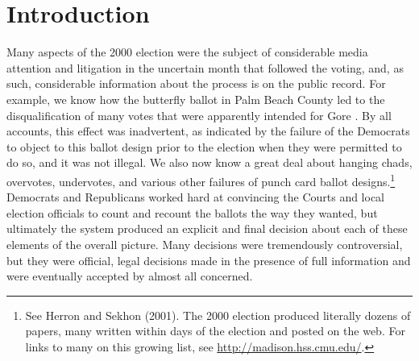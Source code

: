 \documentclass[11pt,titlepage]{article}
\begin{document}
\section{Introduction}

Many aspects of the 2000 election were the subject of considerable
media attention and litigation in the uncertain month that followed
the voting, and, as such, considerable information about the process
is on the public record.  For example, we know how the butterfly
ballot in Palm Beach County led to the disqualification of many votes
that were apparently intended for Gore
\citep{wand:schot:sekh:meba:herr:brad:01,AdaFas00}.  By all accounts,
this effect was inadvertent, as indicated by the failure of the
Democrats to object to this ballot design prior to the election when
they were permitted to do so, and it was not illegal.  We also now
know a great deal about hanging chads, overvotes, undervotes, and
various other failures of punch card ballot designs.\footnote{See
  Herron and Sekhon (2001).\nocite{HerSek01} The 2000 election
  produced literally dozens of papers, many written within days of the
  election and posted on the web.  For links to many on this growing
  list, see \url{http://madison.hss.cmu.edu/}.}  Democrats and
Republicans worked hard at convincing the Courts and local election
officials to count and recount the ballots the way they wanted, but
ultimately the system produced an explicit and final decision about
each of these elements of the overall picture.  Many decisions were
tremendously controversial, but they were official, legal decisions
made in the presence of full information and were eventually accepted
by almost all concerned.
\end{document}
